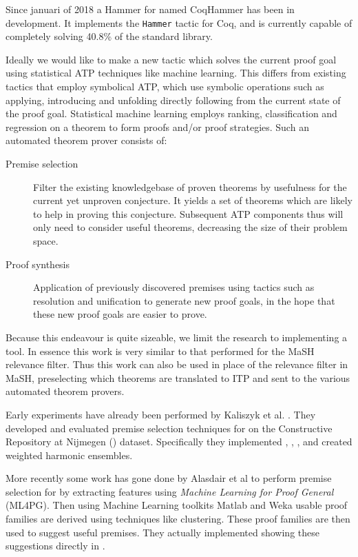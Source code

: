 Since januari of 2018 a Hammer for \coq named CoqHammer has been in development. \cite{czajka2018hammer}
It implements the \texttt{Hammer} tactic for Coq,
and is currently capable of completely solving 40.8\% of the \coq standard library.

Ideally we would like to make a new tactic which solves the current proof goal using statistical ATP techniques like machine learning.
This differs from existing tactics that employ symbolical ATP,
which use symbolic operations such as applying, introducing and unfolding
directly following from the current state of the proof goal.
Statistical machine learning employs ranking, classification and regression on a theorem to form proofs and/or proof strategies.
Such an automated theorem prover consists of:
\begin{description}
\item[Premise selection] Filter the existing knowledgebase of proven theorems by usefulness for the current yet unproven conjecture.
It yields a set of theorems which are likely to help in proving this conjecture.
Subsequent ATP components thus will only need to consider useful theorems, decreasing the size of their problem space.
\item[Proof synthesis] Application of previously discovered premises using tactics
such as resolution and unification \cite{dowek1993complete} to generate new proof goals,
in the hope that these new proof goals are easier to prove.
\end{description}

Because this endeavour is quite sizeable, we limit the research to implementing a \premiseselection tool.
In essence this work is very similar to that performed for the MaSH relevance filter.
Thus this work can also be used in place of the relevance filter in MaSH, preselecting which
theorems are translated to ITP and sent to the various automated theorem provers.

Early experiments have already been performed by Kaliszyk et al. \cite{kaliszyk2014machine}.
They developed and evaluated premise selection techniques for \coq on the Constructive \coq Repository at Nijmegen (\corn) dataset.
Specifically they implemented \knn, \nb, \mepo, and created weighted harmonic ensembles.

More recently some work has gone done by Alasdair et al \cite{hill2018automation} to perform premise selection for
\coq by extracting features using \emph{Machine Learning for Proof General} (ML4PG).
Then using Machine Learning toolkits Matlab and Weka usable proof families are derived using techniques like clustering.
These proof families are then used to suggest useful premises.
They actually implemented showing these suggestions directly in \coqide.

